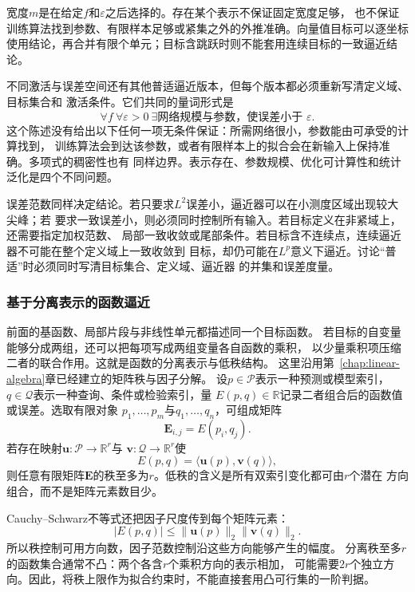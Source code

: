 宽度$m$是在给定$f$和$\varepsilon$之后选择的。存在某个表示不保证固定宽度足够，
也不保证训练算法找到参数、有限样本足够或紧集之外的外推准确。向量值目标可以逐坐标
使用结论，再合并有限个单元；目标含跳跃时则不能套用连续目标的一致逼近结论。

不同激活与误差空间还有其他普适逼近版本，但每个版本都必须重新写清定义域、目标集合和
激活条件。它们共同的量词形式是
\[
  \forall f\ \forall\varepsilon>0\
  \exists\text{网络规模与参数，使误差小于 }\varepsilon.
\]
这个陈述没有给出以下任何一项无条件保证：所需网络很小，参数能由可承受的计算找到，
训练算法会到达该参数，或者有限样本上的拟合会在新输入上保持准确。多项式的稠密性也有
同样边界。表示存在、参数规模、优化可计算性和统计泛化是四个不同问题。

误差范数同样决定结论。若只要求$L^2$误差小，逼近器可以在小测度区域出现较大尖峰；若
要求一致误差小，则必须同时控制所有输入。若目标定义在非紧域上，还需要指定加权范数、
局部一致收敛或尾部条件。若目标含不连续点，连续逼近器不可能在整个定义域上一致收敛到
目标，却仍可能在$L^p$意义下逼近。讨论“普适”时必须同时写清目标集合、定义域、逼近器
的并集和误差度量。

\subsubsection{基于分离表示的函数逼近}
\label{sec:functional-separated-approximation}

前面的基函数、局部片段与非线性单元都描述同一个目标函数。
若目标的自变量能够分成两组，还可以把每项写成两组变量各自函数的乘积，
以少量乘积项压缩二者的联合作用。这就是函数的分离表示与低秩结构。
这里沿用第~\ref{chap:linear-algebra}章已经建立的矩阵秩与因子分解。
设$p\in\mathcal{P}$表示一种预测或模型索引，
$q\in\mathcal{Q}$表示一种查询、条件或检验索引，量
$E(p,q)\in\mathbb{R}$记录二者组合后的函数值或误差。选取有限对象
$p_1,\ldots,p_m$与$q_1,\ldots,q_n$，可组成矩阵
\[
  \bm{E}_{i,j}=E(p_i,q_j).
\]
若存在映射$\bm{u}:\mathcal{P}\to\mathbb{R}^r$与
$\bm{v}:\mathcal{Q}\to\mathbb{R}^r$使
\begin{equation}
  E(p,q)
  =
  \langle\bm{u}(p),\bm{v}(q)\rangle,
  \label{eq:functional-bilinear-factorization}
\end{equation}
则任意有限矩阵$\bm{E}$的秩至多为$r$。低秩的含义是所有双索引变化都可由$r$个潜在
方向组合，而不是矩阵元素数目少。

Cauchy--Schwarz不等式还把因子尺度传到每个矩阵元素：
\[
  |E(p,q)|
  \leq
  \lVert\bm{u}(p)\rVert_2
  \lVert\bm{v}(q)\rVert_2.
\]
所以秩控制可用方向数，因子范数控制沿这些方向能够产生的幅度。
分离秩至多$r$的函数集合通常不凸：两个各含$r$个乘积方向的表示相加，
可能需要$2r$个独立方向。因此，将秩上限作为拟合约束时，不能直接套用凸可行集的一阶判据。

